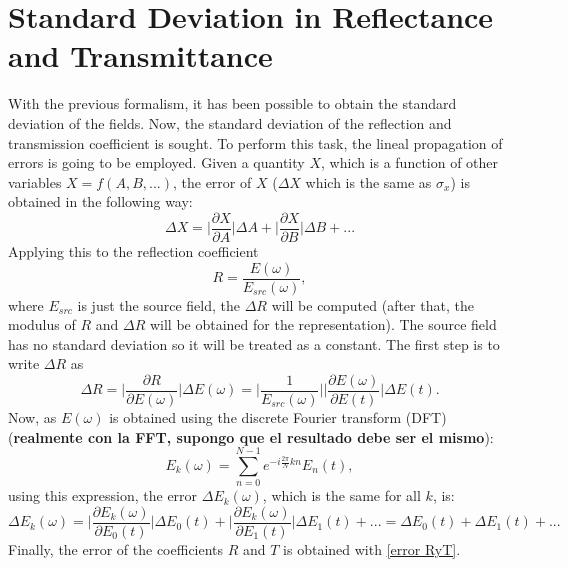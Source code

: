 \documentclass[12pt, oneside]{book}
\begin{document}
\section{Standard Deviation in Reflectance and Transmittance}
With the previous formalism, it has been possible to obtain the standard deviation of the fields. Now, the standard deviation of the reflection and transmission coefficient is sought. To perform this task, the lineal propagation of errors is going to be employed. Given a quantity $X$, which is a function of other variables $X=f(A,B,...)$, the error of $X$ ($\Delta X$ which is the same as $\sigma_x$) is obtained in the following way:
\begin{equation}
\Delta X= \bigg |\frac{\partial X}{\partial A} \bigg | \Delta A + \bigg |\frac{\partial X}{\partial B} \bigg | \Delta B + ...
\end{equation}
Applying this to the reflection coefficient 
\begin{equation}
R=\frac{E(\omega)}{E_{src}(\omega)},
\end{equation}
where $E_{src}$ is just the source field, the $\Delta R$ will be computed (after that, the modulus of $R$ and $\Delta R$ will be obtained for the representation). The source field has no standard deviation so it will be treated as a constant. The first step is to write $\Delta R$ as
\begin{equation} \label{error RyT}
\Delta R= \bigg |  \frac{\partial R}{\partial E(\omega)} \bigg | \Delta E (\omega)=\bigg |\frac{1}{E_{src}(\omega)} \bigg | \bigg |  \frac{\partial E(\omega)}{\partial E(t)} \bigg | \Delta E(t).
\end{equation} 
Now, as $E(\omega)$ is obtained using the discrete Fourier transform (DFT) (\textbf{realmente con la FFT, supongo que el resultado debe ser el mismo}):
\begin{equation}
E_k(\omega)=\sum_{n=0}^{N-1} e^{-i\frac{2\pi}{N} k n} E_n(t),
\end{equation} 
using this expression, the error $\Delta E_k(\omega)$, which is the same for all $k$, is:
\begin{equation}
\Delta E_k(\omega)=\bigg |\frac{\partial E_k(\omega)}{\partial E_0(t)}\bigg | \Delta E_0(t) + \bigg |\frac{\partial E_k(\omega)}{\partial E_1(t)}\bigg | \Delta E_1(t) + ... = \Delta E_0(t) + \Delta E_1(t) + ...
\end{equation}
Finally, the error of the coefficients $R$ and $T$ is obtained with \ref{error RyT}.


\end{document}
